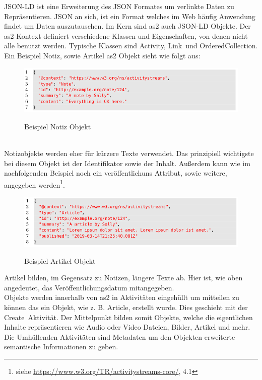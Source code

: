 {	\gls{JSON-LD} ist eine Erweiterung des JSON Formates um verlinkte Daten zu Repräsentieren. JSON an sich, ist ein Format welches im Web häufig Anwendung findet um Daten auszutauschen. Im Kern sind \gls{as2} auch \gls{JSON-LD} Objekte. Der \gls{as2} Kontext definiert verschiedene Klassen und Eigenschaften, von denen nicht alle benutzt werden. Typische Klassen sind \glqq Activity\grqq, \glqq Link\grqq~und \glqq OrderedCollection\grqq. Ein Beispiel Notiz, sowie Artikel \gls{as2} Objekt sieht wie folgt aus:~\\
	\begin{figure}[H]
		\begin{minipage}{\textwidth}
			\centering
			\includegraphics[scale=0.5]{figures/object-note.png}
			\label{fig:object-note}
			\caption{Beispiel Notiz Objekt}
		\end{minipage}
	\end{figure}~\\
	Notizobjekte werden eher für kürzere Texte verwendet. Das prinzipiell wichtigste bei diesem Objekt ist der Identifikator sowie der Inhalt. Außerdem kann wie im nachfolgenden Beispiel noch ein veröffentlichuns Attribut, sowie weitere, angegeben werden\footnote{siehe \url{https://www.w3.org/TR/activitystreams-core/}, 4.1}.
	\begin{figure}[H]
		\begin{minipage}{\textwidth}
			\centering
			\includegraphics[scale=0.5]{figures/object-article.png}
			\label{fig:object-article}
			\caption{Beispiel Artikel Objekt}
		\end{minipage}
	\end{figure}
	Artikel bilden, im Gegensatz zu Notizen, längere Texte ab. Hier ist, wie oben angedeutet, das Veröffentlichungsdatum mitangegeben.~\\
	
	Objekte werden innerhalb von \gls{as2} in Aktivitäten eingehüllt um mitteilen zu können das ein Objekt, wie z. B. \glqq Article\grqq, erstellt wurde. Dies geschieht mit der \glqq Create\grqq~Aktivität. Der Mittelpunkt bilden somit Objekte, welche die eigentlichen Inhalte repräsentieren wie Audio oder Video Dateien, Bilder, Artikel und mehr. Die Umhüllenden Aktivitäten sind Metadaten um den Objekten erweiterte semantische Informationen zu geben.~\\
}
